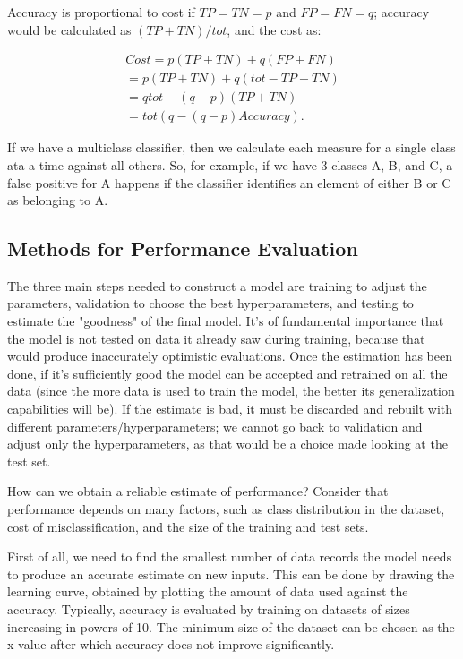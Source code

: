 Accuracy is proportional to cost if $TP = TN = p$ and $FP = FN = q$; accuracy would be calculated as $(TP + TN)/tot$, and the cost as:

\begin{align*}
    Cost = p(TP + TN) + q(FP + FN) \\
    = p(TP + TN) + q(tot - TP - TN) \\
    = qtot - (q - p)(TP + TN) \\
    = tot(q - (q-p)Accuracy).
\end{align*}

If we have a multiclass classifier, then we calculate each measure for a single class ata a time against all others. So, for example, if we have 3 classes A, B, and C, a false positive for A happens if the classifier identifies an element of either B or C as belonging to A.

\subsection{Methods for Performance Evaluation}

The three main steps needed to construct a model are training to adjust the parameters, validation to choose the best hyperparameters, and testing to estimate the "goodness" of the final model. It's of fundamental importance that the model is not tested on data it already saw during training, because that would produce inaccurately optimistic evaluations. Once the estimation has been done, if it's sufficiently good the model can be accepted and retrained on all the data (since the more data is used to train the model, the better its generalization capabilities will be). If the estimate is bad, it must be discarded and rebuilt with different parameters/hyperparameters; we cannot go back to validation and adjust only the hyperparameters, as that would be a choice made looking at the test set.

How can we obtain a reliable estimate of performance? Consider that performance depends on many factors, such as class distribution in the dataset, cost of misclassification, and the size of the training and test sets.

First of all, we need to find the smallest number of data records the model needs to produce an accurate estimate on new inputs. This can be done by drawing the learning curve, obtained by plotting the amount of data used against the accuracy. Typically, accuracy is evaluated by training on datasets of sizes increasing in powers of 10. The minimum size of the dataset can be chosen as the x value after which accuracy does not improve significantly.

